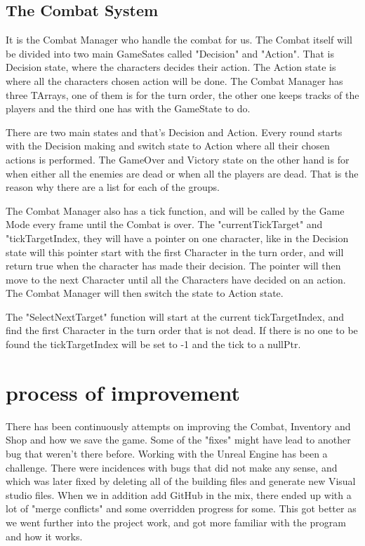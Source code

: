 \subsection{The Combat System}
It is the Combat Manager who handle the combat for us.
The Combat itself will be divided into two main GameSates called "Decision" and "Action". That is Decision state, where the characters decides their action. The Action state is where all the characters chosen action will be done. The Combat Manager has three TArrays, one of them is for the turn order, the other one keeps tracks of the players and the third one has with the GameState to do.

There are two main states and that's Decision and Action. Every round starts with the Decision making and switch state to Action where all their chosen actions is performed. The GameOver and Victory state on the other hand is for when either all the enemies are dead or when all the players are dead. That is the reason why there are a list for each of the groups.

The Combat Manager also has a tick function, and will be called by the Game Mode every frame until the Combat is over. The "currentTickTarget" and "tickTargetIndex, they will have a pointer on one character, like in the Decision state will this pointer start with the first Character in the turn order, and will return true when the character has made their decision. The pointer will then move to the next Character until all the Characters have decided on an action. The Combat Manager will then switch the state to Action state.

The "SelectNextTarget" function will start at the current tickTargetIndex, and find the first Character in the turn order that is not dead. If there is no one to be found the tickTargetIndex will be set to -1 and the tick to a nullPtr. 
\cite{BuildingAnRPG}

\section{process of improvement}
\label{sec:improvements}
There has been continuously attempts on improving the Combat, Inventory and Shop and how we save the game. Some of the "fixes" might have lead to another bug that weren't there before. Working with the Unreal Engine has been a challenge. There were incidences with bugs that did not make any sense, and which was later fixed by deleting all of the building files and generate new Visual studio files. When we in addition add GitHub in the mix, there ended up with a lot of "merge conflicts" and some overridden progress for some. This got better as we went further into the project work, and got more familiar with the program and how it works.


